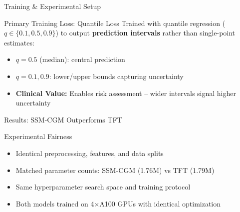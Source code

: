 \documentclass[aspectratio=169,xcolor=dvipsnames]{beamer}
\begin{document}
\begin{frame}{Training \& Experimental Setup}
    \vspace{0.05em}
    \begin{block}{Primary Training Loss: Quantile Loss}
        Trained with quantile regression ($q \in \{0.1, 0.5, 0.9\}$) to output \textbf{prediction intervals} rather than single-point estimates:
        \begin{itemize}
            \item $q=0.5$ (median): central prediction
            \item $q=0.1, 0.9$: lower/upper bounds capturing uncertainty
            \item \textbf{Clinical Value:} Enables risk assessment -- wider intervals signal higher uncertainty
        \end{itemize}
    \end{block}
\end{frame}

\begin{frame}{Results: SSM-CGM Outperforms TFT}
    \begin{block}{Experimental Fairness}
        \begin{itemize}
            \item Identical preprocessing, features, and data splits
            \item Matched parameter counts: SSM-CGM (1.76M) vs TFT (1.79M)
            \item Same hyperparameter search space and training protocol
            \item Both models trained on 4$\times$A100 GPUs with identical optimization
        \end{itemize}
    \end{block}
\end{frame}
\end{document}
